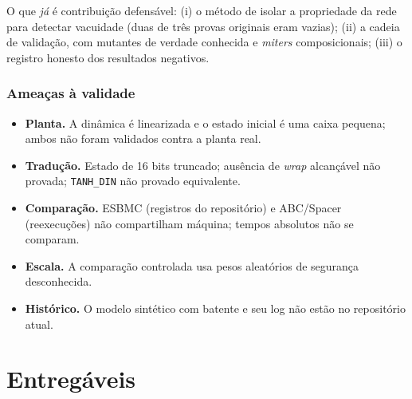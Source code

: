 \documentclass[12pt,openright,oneside,a4paper,chapter=TITLE,sumario=tradicional,english,brazil]{abntex2}
\begin{document}
O que \emph{já} é contribuição defensável: (i) o método de isolar a propriedade da rede para detectar vacuidade (duas de três provas originais eram vazias); (ii) a cadeia de validação, com mutantes de verdade conhecida e \emph{miters} composicionais; (iii) o registro honesto dos resultados negativos.

\subsection{Ameaças à validade}

\begin{itemize}
  \item \textbf{Planta.} A dinâmica é linearizada e o estado inicial é uma caixa pequena; ambos não foram validados contra a planta real.
  \item \textbf{Tradução.} Estado de 16 bits truncado; ausência de \emph{wrap} alcançável não provada; \texttt{TANH\_DIN} não provado equivalente.
  \item \textbf{Comparação.} ESBMC (registros do repositório) e ABC/Spacer (reexecuções) não compartilham máquina; tempos absolutos não se comparam.
  \item \textbf{Escala.} A comparação controlada usa pesos aleatórios de segurança desconhecida.
  \item \textbf{Histórico.} O modelo sintético com batente e seu log não estão no repositório atual.
\end{itemize}


\chapter{Entregáveis}\label{cap:entreg}
\end{document}
